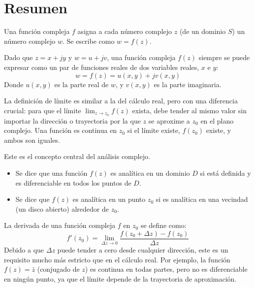\section{Resumen}

\begin{tcolorbox}[title=Función de variable compleja,resumen]
Una función compleja $f$ asigna a cada número complejo $z$ (de un dominio $S$) un número complejo $w$. Se escribe como $w = f(z)$.

Dado que $z = x + jy$ y $w = u + jv$, una función compleja $f(z)$ siempre se puede expresar como un par de funciones reales de dos variables reales, $x$ e $y$:
$$
w = f(z) = u(x, y) + jv(x, y)
$$
Donde $u(x, y)$ es la parte real de $w$, y $v(x, y)$ es la parte imaginaria.
\end{tcolorbox}

\begin{tcolorbox}[title=Limite y continuidad,resumen]
La definición de límite es similar a la del cálculo real, pero con una diferencia crucial: para que el límite $\lim_{z\to z_0}f(z)$ exista, debe tender al mismo valor sin importar la dirección o trayectoria por la que $z$ se aproxime a $z_0$ en el plano complejo. Una función es continua en $z_0$ si el límite existe, $f(z_0)$ existe, y ambos son iguales.
\end{tcolorbox}

\begin{tcolorbox}[title=Analiticidad,resumen]
Este es el concepto central del análisis complejo.
\begin{itemize}
  \item Se dice que una función $f(z)$ es analítica en un dominio $D$ si está definida y es diferenciable en todos los puntos de $D$.
  \item Se dice que $f(z)$ es analítica en un punto $z_0$ si es analítica en una vecindad (un disco abierto) alrededor de $z_0$.
\end{itemize}
\end{tcolorbox}

\begin{tcolorbox}[title=Derivada,resumen]
La derivada de una función compleja $f$ en $z_0$ se define como:
$$
f'(z_0) = \lim_{\Delta z \to 0}\frac{f(z_0+\Delta z)-f(z_0)}{\Delta z}
$$
Debido a que $\Delta z$ puede tender a cero desde cualquier dirección, este es un requisito mucho más estricto que en el cálculo real. Por ejemplo, la función $f(z) = \bar{z}$ (conjugado de $z$) es continua en todas partes, pero no es diferenciable en ningún punto, ya que el límite depende de la trayectoria de aproximación.
\end{tcolorbox}

